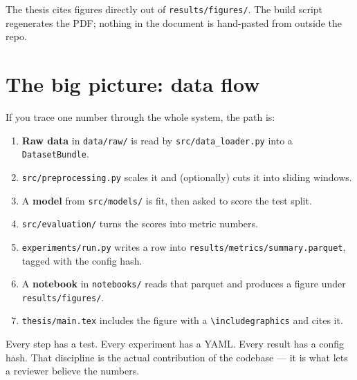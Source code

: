 \documentclass[11pt,a4paper]{article}
\newcommand{\code}[1]{\texttt{#1}}
\begin{document}
The thesis cites figures directly out of \code{results/figures/}. The build script regenerates the PDF; nothing in the document is hand-pasted from outside the repo.

\section{The big picture: data flow}

If you trace one number through the whole system, the path is:

\begin{enumerate}
  \item \textbf{Raw data} in \code{data/raw/} is read by \code{src/data\_loader.py} into a \code{DatasetBundle}.
  \item \code{src/preprocessing.py} scales it and (optionally) cuts it into sliding windows.
  \item A \textbf{model} from \code{src/models/} is fit, then asked to score the test split.
  \item \code{src/evaluation/} turns the scores into metric numbers.
  \item \code{experiments/run.py} writes a row into \code{results/metrics/summary.parquet}, tagged with the config hash.
  \item A \textbf{notebook} in \code{notebooks/} reads that parquet and produces a figure under \code{results/figures/}.
  \item \code{thesis/main.tex} includes the figure with a \code{\textbackslash includegraphics} and cites it.
\end{enumerate}

Every step has a test. Every experiment has a YAML. Every result has a config hash. That discipline is the actual contribution of the codebase --- it is what lets a reviewer believe the numbers.
\end{document}
